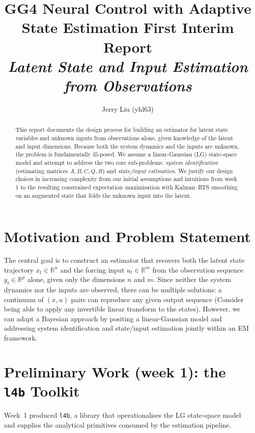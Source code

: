 \documentclass[11pt,a4paper]{article}
\title{\textbf{GG4 Neural Control with Adaptive State Estimation First Interim Report}\\[0.4em]\large\textit{Latent State and Input Estimation from Observations}}
\author{Jerry Liu (yhl63) \\}
\date{}
\begin{document}
\maketitle
\vspace{-2em}

\begin{abstract}
This report documents the design process for building an estimator for latent state variables and unknown inputs from observations alone, given knowledge of the latent and input dimensions. Because both the system dynamics and the inputs are unknown, the problem is fundamentally ill-posed. We assume a linear-Gaussian (LG) state-space model and attempt to address the two core sub-problems: \emph{system identification} (estimating matrices $A, B, C, Q, R$) and \emph{state/input estimation}.
We justify our design choices in increasing complexity from our initial assumptions and intuitions from week 1 to the resulting constrained expectation--maximisation with Kalman--RTS smoothing on an augmented state that folds the unknown input into the latent.
\end{abstract}

\section{Motivation and Problem Statement}

The central goal is to construct an estimator that recovers both the latent state trajectory $x_t \in \mathbb{R}^n$ and the forcing input $u_t \in \mathbb{R}^m$ from the observation sequence $y_t \in \mathbb{R}^p$ alone, given only the dimensions $n$ and $m$. Since neither the system dynamics nor the inputs are observed, there can be multiple solutions: a continuum of $(x, u)$ pairs can reproduce any given output sequence (Consider being able to apply any invertible linear transform to the states). However, we can adapt a Bayesian approach by positing a linear-Gaussian model and addressing system identification and state/input estimation jointly within an EM framework.

\section{Preliminary Work (week 1): the \texttt{l4b} Toolkit}

Week~1 produced \texttt{l4b}, a library that operationalises the LG state-space model and supplies the analytical primitives consumed by the estimation pipeline.
\end{document}

